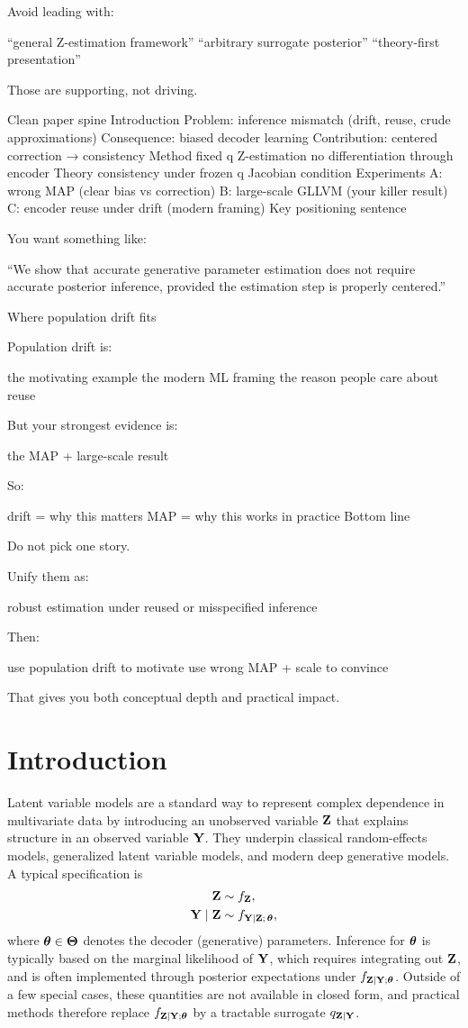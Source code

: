 \documentclass[twoside,11pt]{article}
\begin{document}
Avoid leading with:

“general Z-estimation framework”
“arbitrary surrogate posterior”
“theory-first presentation”

Those are supporting, not driving.

Clean paper spine
Introduction
Problem: inference mismatch (drift, reuse, crude approximations)
Consequence: biased decoder learning
Contribution: centered correction → consistency
Method
fixed q
Z-estimation
no differentiation through encoder
Theory
consistency under frozen q
Jacobian condition
Experiments
A: wrong MAP (clear bias vs correction)
B: large-scale GLLVM (your killer result)
C: encoder reuse under drift (modern framing)
Key positioning sentence

You want something like:

“We show that accurate generative parameter estimation does not require accurate posterior inference, provided the estimation step is properly centered.”

Where population drift fits

Population drift is:

the motivating example
the modern ML framing
the reason people care about reuse

But your strongest evidence is:

the MAP + large-scale result

So:

drift = why this matters
MAP = why this works in practice
Bottom line

Do not pick one story.

Unify them as:

robust estimation under reused or misspecified inference

Then:

use population drift to motivate
use wrong MAP + scale to convince

That gives you both conceptual depth and practical impact.

\newpage

\section{Introduction}

Latent variable models are a standard way to represent complex dependence in multivariate data by introducing an unobserved variable ${\bf Z}$ that explains structure in an observed variable ${\bf Y}$.
They underpin classical random-effects models, generalized latent variable models, and modern deep generative models.
A typical specification is
\begin{align}
{\bf Z} &\sim f_{{\bf Z}}, \nonumber\\
{\bf Y} \mid {\bf Z} &\sim f_{{\bf Y}\mid {\bf Z};\,{\bm{\theta}}},
\label{eq:intro_generative}
\end{align}
where ${\bm{\theta}}\in\bm\Theta$ denotes the decoder (generative) parameters.
Inference for ${\bm{\theta}}$ is typically based on the marginal likelihood of ${\bf Y}$,
which requires integrating out ${\bf Z}$, and is often implemented through posterior expectations under $f_{{\bf Z}\mid{\bf Y};{\bm{\theta}}}$.
Outside of a few special cases, these quantities are not available in closed form, and practical methods therefore replace $f_{{\bf Z}\mid{\bf Y};{\bm{\theta}}}$ by a tractable surrogate $q_{{\bf Z}\mid{\bf Y}}$.
\end{document}
